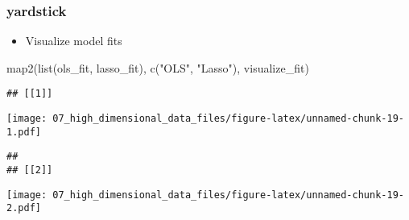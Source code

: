 \documentclass[
]{book}
\newenvironment{Shaded}{\begin{snugshade}}{\end{snugshade}}
\newcommand{\FunctionTok}[1]{\textcolor[rgb]{0.00,0.00,0.00}{#1}}
\newcommand{\NormalTok}[1]{#1}
\newcommand{\StringTok}[1]{\textcolor[rgb]{0.31,0.60,0.02}{#1}}
\providecommand{\tightlist}{%
  \setlength{\itemsep}{0pt}\setlength{\parskip}{0pt}}
\begin{document}
\hypertarget{yardstick}{%
\subsubsection{yardstick}\label{yardstick}}

\begin{itemize}
\tightlist
\item
  Visualize model fits
\end{itemize}

\begin{Shaded}
\begin{Highlighting}[]
\FunctionTok{map2}\NormalTok{(}\FunctionTok{list}\NormalTok{(ols\_fit, lasso\_fit), }\FunctionTok{c}\NormalTok{(}\StringTok{"OLS"}\NormalTok{, }\StringTok{"Lasso"}\NormalTok{), visualize\_fit) }
\end{Highlighting}
\end{Shaded}

\begin{verbatim}
## [[1]]
\end{verbatim}

\texttt{[image: 07\_high\_dimensional\_data\_files/figure-latex/unnamed-chunk-19-1.pdf]}

\begin{verbatim}
## 
## [[2]]
\end{verbatim}

\texttt{[image: 07\_high\_dimensional\_data\_files/figure-latex/unnamed-chunk-19-2.pdf]}
\end{document}
